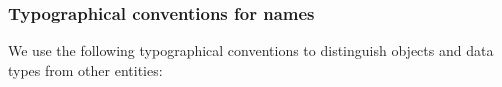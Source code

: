 






\subsubsection{Typographical conventions for names}
\label{sec:notation-typographical}

We use the following typographical conventions to distinguish
objects and data types from other entities:

